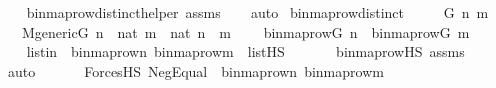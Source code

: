 \begin{isabellebody}
\ \ \isamarkupfalse%
\ binmap{\isacharunderscore}{\kern0pt}row{\isacharprime}{\kern0pt}{\isacharunderscore}{\kern0pt}distinct{\isacharunderscore}{\kern0pt}helper\ assms\isanewline
\ \ \isamarkupfalse%
\ auto%
\endisatagproof
{\isafoldproof}%
%
\isadelimproof
\isanewline
%
\endisadelimproof
\isanewline
{}\isamarkupfalse%
\ binmap{\isacharunderscore}{\kern0pt}row{\isacharunderscore}{\kern0pt}distinct\ {\isacharcolon}{\kern0pt}\ \isanewline
\ \ \ G\ n\ m\ \isanewline
\ \ \ {\isachardoublequoteopen}M{\isacharunderscore}{\kern0pt}generic{\isacharparenleft}{\kern0pt}G{\isacharparenright}{\kern0pt}{\isachardoublequoteclose}\ {\isachardoublequoteopen}n\ {\isasymin}\ nat{\isachardoublequoteclose}\ {\isachardoublequoteopen}m\ {\isasymin}\ nat{\isachardoublequoteclose}\ {\isachardoublequoteopen}n\ {\isasymnoteq}\ m{\isachardoublequoteclose}\ \isanewline
\ \ \ {\isachardoublequoteopen}binmap{\isacharunderscore}{\kern0pt}row{\isacharparenleft}{\kern0pt}G{\isacharcomma}{\kern0pt}\ n{\isacharparenright}{\kern0pt}\ {\isasymnoteq}\ binmap{\isacharunderscore}{\kern0pt}row{\isacharparenleft}{\kern0pt}G{\isacharcomma}{\kern0pt}\ m{\isacharparenright}{\kern0pt}{\isachardoublequoteclose}\ \isanewline
%
\isadelimproof
%
\endisadelimproof
%
\isatagproof
{}\isamarkupfalse%
\ {\isacharminus}{\kern0pt}\ \isanewline
\isanewline
\ \ \isamarkupfalse%
\ listin\ {\isacharcolon}{\kern0pt}\ {\isachardoublequoteopen}{\isacharbrackleft}{\kern0pt}binmap{\isacharunderscore}{\kern0pt}row{\isacharprime}{\kern0pt}{\isacharparenleft}{\kern0pt}n{\isacharparenright}{\kern0pt}{\isacharcomma}{\kern0pt}\ binmap{\isacharunderscore}{\kern0pt}row{\isacharprime}{\kern0pt}{\isacharparenleft}{\kern0pt}m{\isacharparenright}{\kern0pt}{\isacharbrackright}{\kern0pt}\ {\isasymin}\ list{\isacharparenleft}{\kern0pt}HS{\isacharparenright}{\kern0pt}{\isachardoublequoteclose}\ \isanewline
\ \ \ \ \isamarkupfalse%
\ binmap{\isacharunderscore}{\kern0pt}row{\isacharprime}{\kern0pt}{\isacharunderscore}{\kern0pt}HS\ assms\isanewline
\ \ \ \ \isamarkupfalse%
\ auto\isanewline
\ \ \isanewline
\ \ \isamarkupfalse%
\ {\isachardoublequoteopen}ForcesHS{\isacharparenleft}{\kern0pt}{}{\isacharcomma}{\kern0pt}\ Neg{\isacharparenleft}{\kern0pt}Equal{\isacharparenleft}{\kern0pt}{}{\isacharcomma}{\kern0pt}\ {}{\isacharparenright}{\kern0pt}{\isacharparenright}{\kern0pt}{\isacharcomma}{\kern0pt}\ {\isacharbrackleft}{\kern0pt}binmap{\isacharunderscore}{\kern0pt}row{\isacharprime}{\kern0pt}{\isacharparenleft}{\kern0pt}n{\isacharparenright}{\kern0pt}{\isacharcomma}{\kern0pt}\ binmap{\isacharunderscore}{\kern0pt}row{\isacharprime}{\kern0pt}{\isacharparenleft}{\kern0pt}m{\isacharparenright}{\kern0pt}{\isacharbrackright}{\kern0pt}{\isacharparenright}{\kern0pt}{\isachardoublequoteclose}\isanewline

\end{isabellebody}
